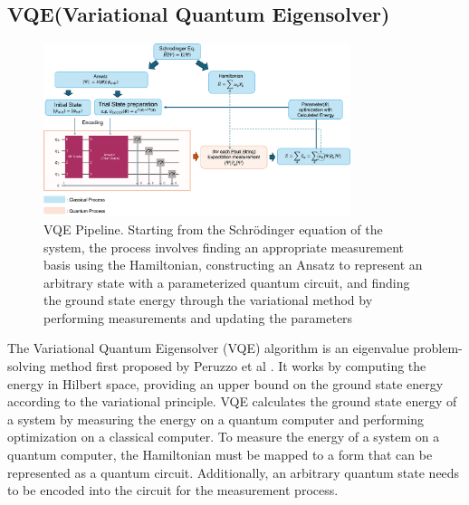 \documentclass[pdflatex,sn-mathphys-num]{sn-jnl}%
\theoremstyle{thmstyleone}%
\theoremstyle{thmstyletwo}%
\theoremstyle{thmstylethree}%
\begin{document}
\subsection{VQE(Variational Quantum Eigensolver)}\label{subsec2.2}
\begin{figure}[htbp]
\centering
\includegraphics[width=0.8\textwidth]{fig/VQE_pipeline.png}
\caption{VQE Pipeline. Starting from the Schrödinger equation of the system, the process involves finding an appropriate measurement basis using the Hamiltonian, constructing an Ansatz to represent an arbitrary state with a parameterized quantum circuit, and finding the ground state energy through the variational method by performing measurements and updating the parameters}\label{Fig.2}
\end{figure}
The Variational Quantum Eigensolver (VQE) algorithm is an eigenvalue problem-solving method first proposed by Peruzzo et al \cite{VQE1}. 
It works by computing the energy in Hilbert space, providing an upper bound on the ground state energy according to the variational principle. 
VQE calculates the ground state energy of a system by measuring the energy on a quantum computer and performing optimization on a classical computer. 
To measure the energy of a system on a quantum computer, the Hamiltonian must be mapped to a form that can be represented as a quantum circuit. 
Additionally, an arbitrary quantum state needs to be encoded into the circuit for the measurement process.
\end{document}
